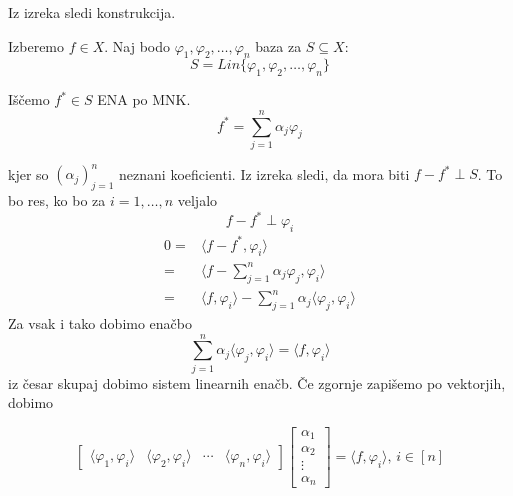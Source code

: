 \documentclass[a4paper,12pt]{article}
\newcommand{\innerproduct}[2]{\langle #1, #2 \rangle}
\theoremstyle{definition}
\theoremstyle{remark}
\begin{document}
Iz izreka sledi konstrukcija.

Izberemo $f \in X$. Naj bodo $\varphi_1, \varphi_2, \dots, \varphi_n$ baza za $S \subseteq X$:
\begin{equation*}
    S = Lin\{\varphi_1, \varphi_2, \dots, \varphi_n\}
\end{equation*}

Iščemo $f^* \in S$ ENA po MNK.
\begin{equation*}
    f^* = \sum_{j = 1}^{n} \alpha_j \varphi_j
\end{equation*}

kjer so $(\alpha_j)_{j = 1}^n$ neznani koeficienti. Iz izreka sledi, da mora biti $f - f^* \perp S$. To bo res, ko bo za $i = 1, \dots, n$ veljalo
\begin{equation*}
    f - f^* \perp \varphi_i
\end{equation*}
\begin{align*}
    0 =& \innerproduct{f - f^*}{\varphi_i}\\
      =& \innerproduct{f - \sum_{j = 1}^{n}\alpha_j \varphi_j}{\varphi_i}\\
      =& \innerproduct{f}{\varphi_i} - \sum_{j = 1}^{n}\alpha_j \innerproduct{\varphi_j}{\varphi_i}
\end{align*}
Za vsak i tako dobimo enačbo
\begin{equation*}
    \sum_{j = 1}^{n} \alpha_j \innerproduct{\varphi_j}{\varphi_i} = \innerproduct{f}{\varphi_i}
\end{equation*}
iz česar skupaj dobimo sistem linearnih enačb. Če zgornje zapišemo po vektorjih, dobimo

\begin{equation*}
    \begin{bmatrix}
        \innerproduct{\varphi_1}{\varphi_i} & \innerproduct{\varphi_2}{\varphi_i} & \cdots & \innerproduct{\varphi_n}{\varphi_i}
    \end{bmatrix}
    \begin{bmatrix}
        \alpha_1 \\
        \alpha_2 \\
        \vdots \\
        \alpha_n
    \end{bmatrix}
    =
    \innerproduct{f}{\varphi_i} \text{, } i \in [n]
\end{equation*}
\end{document}
